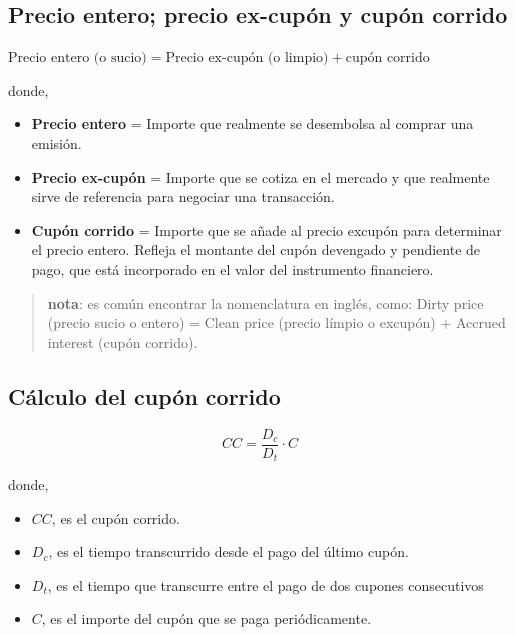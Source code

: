 \documentclass[
  letterpaper,
  DIV=11,
  numbers=noendperiod]{scrreprt}
\begin{document}
\begin{tcolorbox}
\subsection*{Precio entero; precio ex-cupón y cupón
corrido}\label{precio-entero-precio-ex-cupuxf3n-y-cupuxf3n-corrido}

\textbf{\(\text{Precio entero (o sucio)} = \text{Precio ex-cupón (o limpio)} + \text{cupón corrido}\)}

donde,

\begin{itemize}
\item
  \textbf{Precio entero} = Importe que realmente se desembolsa al
  comprar una emisión.
\item
  \textbf{Precio ex-cupón} = Importe que se cotiza en el mercado y que
  realmente sirve de referencia para negociar una transacción.
\item
  \textbf{Cupón corrido} = Importe que se añade al precio excupón para
  determinar el precio entero. Refleja el montante del cupón devengado y
  pendiente de pago, que está incorporado en el valor del instrumento
  financiero.
\end{itemize}

\begin{quote}
\textbf{nota}: es común encontrar la nomenclatura en inglés, como: Dirty
price (precio sucio o entero) = Clean price (precio límpio o excupón) +
Accrued interest (cupón corrido).
\end{quote}

\subsection*{Cálculo del cupón
corrido}\label{cuxe1lculo-del-cupuxf3n-corrido}

\[CC=\frac{D_c}{D_t}\cdot C\]

donde,

\begin{itemize}
\item
  \(CC\), es el cupón corrido.
\item
  \(D_{c}\), es el tiempo transcurrido desde el pago del último cupón.
\item
  \(D_{t}\), es el tiempo que transcurre entre el pago de dos cupones
  consecutivos
\item
  \(C\), es el importe del cupón que se paga periódicamente.
\end{itemize}


\end{tcolorbox}
\end{document}
